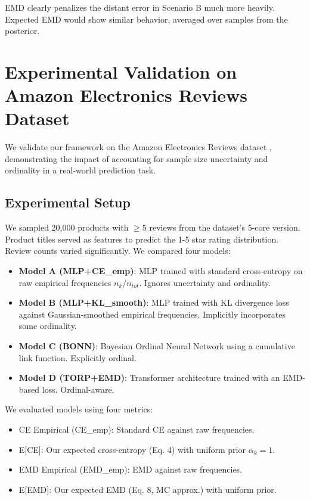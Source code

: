 \documentclass[journal]{IEEEtran}
\begin{document}
EMD clearly penalizes the distant error in Scenario B much more heavily. Expected EMD would show similar behavior, averaged over samples from the posterior.

\section{Experimental Validation on Amazon Electronics Reviews Dataset}

We validate our framework on the Amazon Electronics Reviews dataset \cite{he2016}, demonstrating the impact of accounting for sample size uncertainty and ordinality in a real-world prediction task.

\subsection{Experimental Setup}
We sampled 20,000 products with $\ge 5$ reviews from the dataset's 5-core version. Product titles served as features to predict the 1-5 star rating distribution. Review counts varied significantly. We compared four models:
\begin{itemize}
    \item \textbf{Model A (MLP+CE\_emp)}: MLP trained with standard cross-entropy on raw empirical frequencies $n_k/n_{tot}$. Ignores uncertainty and ordinality.
    \item \textbf{Model B (MLP+KL\_smooth)}: MLP trained with KL divergence loss against Gaussian-smoothed empirical frequencies. Implicitly incorporates some ordinality.
    \item \textbf{Model C (BONN)}: Bayesian Ordinal Neural Network using a cumulative link function. Explicitly ordinal.
    \item \textbf{Model D (TORP+EMD)}: Transformer architecture trained with an EMD-based loss. Ordinal-aware.
\end{itemize}
We evaluated models using four metrics:
\begin{itemize}
    \item CE Empirical (CE\_emp): Standard CE against raw frequencies.
    \item E[CE]: Our expected cross-entropy (Eq. 4) with uniform prior $\alpha_k=1$.
    \item EMD Empirical (EMD\_emp): EMD against raw frequencies.
    \item E[EMD]: Our expected EMD (Eq. 8, MC approx.) with uniform prior.
\end{itemize}
\end{document}
